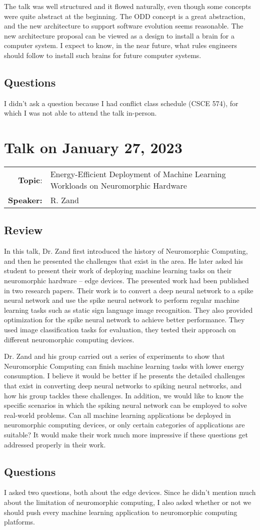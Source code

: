 \documentclass[11pt, oneside]{article}   	%
\begin{document}
The talk was well structured and it flowed naturally, even though some concepts were quite abstract at the beginning. The ODD concept is a great abstraction, and the new architecture to support software evolution seems reasonable. The new architecture proposal can be viewed as a design to install a brain for a computer system. I expect to know, in the near future, what rules engineers should follow to install such brains for future computer systems.

\subsection{Questions}
I didn't ask a question because I had conflict class schedule (CSCE 574), for which I was not able to attend the talk in-person.

\newpage
\section{Talk on January 27, 2023}
\begin{tabularx} {\textwidth}{r X}
\textbf{Topic}: & Energy-Efficient Deployment of Machine Learning Workloads on Neuromorphic Hardware \\
\textbf{Speaker:} & R. Zand\\
\end{tabularx}

\subsection{Review}
In this talk, Dr. Zand first introduced the history of Neuromorphic Computing, and then he presented the challenges that exist in the area. He later asked his student to present their work of deploying machine learning tasks on their neuromorphic hardware -- edge devices. The presented work had been published in two research papers. Their work is to convert a deep neural network to a spike neural network and use the spike neural network to perform regular machine learning tasks such as static sign language image recognition. They also provided optimization for the spike neural network to achieve better performance. They used image classification tasks for evaluation, they tested their approach on different neuromorphic computing devices. 

Dr. Zand and his group carried out a series of experiments to show that Neuromorphic Computing can finish machine learning tasks with lower energy consumption. I believe it would be better if he presents the detailed challenges that exist in converting deep neural networks to spiking neural networks, and how his group tackles these challenges. In addition, we would like to know the specific scenarios in which the spiking neural network can be employed to solve real-world problems. Can all machine learning applications be deployed in neuromorphic computing devices, or only certain categories of applications are suitable? It would make their work much more impressive if these questions get addressed properly in their work.


\subsection{Questions}
I asked two questions, both about the edge devices. Since he didn't mention much about the limitation of neuromorphic computing, I also asked whether or not we should push every machine learning application to neuromorphic computing platforms.
\end{document}

